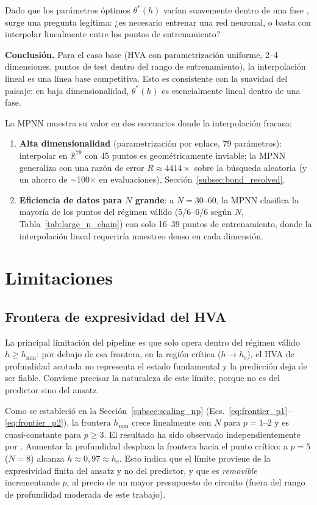 \documentclass[11pt,a4paper,spanish]{book}
\begin{document}
Dado que los parámetros óptimos $\theta^*(h)$ varían suavemente dentro de una fase \citep{mele2022}, surge una pregunta legítima: ¿es necesario entrenar una red neuronal, o basta con interpolar linealmente entre los puntos de entrenamiento?

\textbf{Conclusión.} Para el caso base (HVA con parametrización uniforme, 2--4 dimensiones, puntos de test dentro del rango de entrenamiento), la interpolación lineal es una línea base competitiva. Esto es consistente con la suavidad del paisaje: en baja dimensionalidad, $\theta^*(h)$ es esencialmente lineal dentro de una fase.

La MPNN muestra su valor en dos escenarios donde la interpolación fracasa:
\begin{enumerate}
    \item \textbf{Alta dimensionalidad} (parametrización por enlace, 79 parámetros): interpolar en $\mathbb{R}^{79}$ con 45 puntos es geométricamente inviable; la MPNN generaliza con una razón de error $R \approx 4414\times$ sobre la búsqueda aleatoria (y un ahorro de $\sim$100$\times$ en evaluaciones), Sección~\ref{subsec:bond_resolved}.
    \item \textbf{Eficiencia de datos para $N$ grande}: a $N = 30$--$60$, la MPNN clasifica la mayoría de los puntos del régimen válido (5/6--6/6 según $N$, Tabla~\ref{tab:large_n_chain}) con solo 16--39 puntos de entrenamiento, donde la interpolación lineal requeriría muestreo denso en cada dimensión.
\end{enumerate}


\section{Limitaciones}
\label{sec:limitaciones}

\subsection{Frontera de expresividad del HVA}
\label{subsec:frontera_expresividad}

La principal limitación del pipeline es que solo opera dentro del régimen válido $h \geq h_{\min}$: por debajo de esa frontera, en la región crítica ($h \to h_c$), el HVA de profundidad acotada no representa el estado fundamental y la predicción deja de ser fiable. Conviene precisar la naturaleza de este límite, porque no es del predictor sino del ansatz.

Como se estableció en la Sección~\ref{subsec:scaling_np} (Ecs.~\ref{eq:frontier_p1}--\ref{eq:frontier_p2}), la frontera $h_{\min}$ crece linealmente con $N$ para $p = 1$--$2$ y es cuasi-constante para $p \geq 3$. El resultado ha sido observado independientemente por \citet{tripathi2026}. Aumentar la profundidad desplaza la frontera hacia el punto crítico: a $p = 5$ ($N = 8$) alcanza $h \approx 0,97 \approx h_c$. Esto indica que el límite proviene de la expresividad finita del ansatz y no del predictor, y que es \emph{removible} incrementando $p$, al precio de un mayor presupuesto de circuito (fuera del rango de profundidad moderada de este trabajo).
\end{document}
